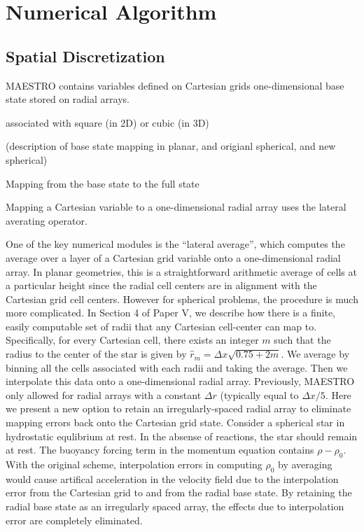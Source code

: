\section{Numerical Algorithm}

\subsection{Spatial Discretization}\label{Sec:Spatial}
MAESTRO contains variables defined on Cartesian grids 
one-dimensional base state stored on radial arrays.

 associated with square (in 2D) or cubic (in 3D)


(description of base state mapping in planar, and origianl spherical, and new spherical)

Mapping from the base state to the full state


Mapping a Cartesian variable to a one-dimensional radial array uses the lateral averating operator.

One of the key numerical modules is the ``lateral average'', which computes the average over a 
layer of a Cartesian grid variable onto a one-dimensional radial array.
In planar geometries, this is a straightforward arithmetic average of cells at
a particular height since the radial cell centers are in alignment
with the Cartesian grid cell centers.
However for spherical problems, the procedure is much more complicated.
In Section 4 of Paper V, we describe how there is a finite, easily computable set of radii that any Cartesian cell-center can map to.  
Specifically, for every Cartesian cell, there exists an integer $m$ such that the radius to the center of the star is given by $\hat{r}_m=\Delta x\sqrt{0.75+2m}$.
We average by binning all the cells associated with each radii and taking the average.
Then we interpolate this data onto a one-dimensional radial array.  Previously, MAESTRO only allowed for radial arrays with a constant $\Delta r$ (typically equal to $\Delta x/5$.
Here we present a new option to retain an irregularly-spaced radial array to eliminate mapping errors back onto the Cartesian grid state.
Consider a spherical star in hydrostatic equlibrium at rest.  In the absense of reactions, the star should remain at rest.
The buoyancy forcing term in the momentum equation contains $\rho-\rho_0$.  With the original scheme, interpolation errors in computing $\rho_0$ by averaging would cause artifical acceleration in the velocity field due to the interpolation error from the Cartesian grid to and from the radial base state.  By retaining the radial base state as an irregularly spaced array, the effects due to interpolation error are completely eliminated.



